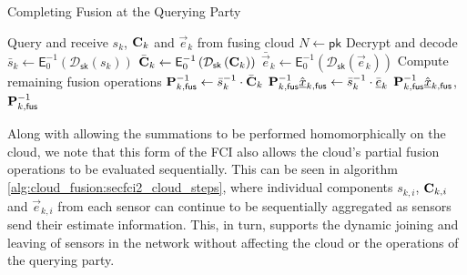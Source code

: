 \begin{algorithm}[htbp]
\caption{Completing Fusion at the Querying Party}\label{alg:cloud_fusion:secfci2_query_steps}
\begin{algorithmic}[1]
    \State Query and receive $s_k$, ${{\mathbf{C}}}_k$ and $\vec{e}_k$ from fusing cloud
    \State $N \gets \mathsf{pk}$
    \LineComment Decrypt and decode
    \State $\bar{s}_k \gets \mathsf{E}^{-1}_{0}\left(\mathcal{D}_{\mathsf{sk}}\left(s_k\right)\right)$
    \State $\bar{{{\mathbf{C}}}}_k \gets \mathsf{E}^{-1}_{0}\left(\mathcal{D}_{\mathsf{sk}}\left({{\mathbf{C}}}_k\right)\right)$
    \State $\bar{\vec{e}}_k \gets \mathsf{E}^{-1}_{0}\left(\mathcal{D}_{\mathsf{sk}}\left(\vec{e}_k\right)\right)$
    \LineComment Compute remaining fusion operations
    \State ${{\mathbf{P}}}_{k,\mathsf{fus}}^{-1} \gets \bar{s}_k^{-1} \cdot \bar{{{\mathbf{C}}}}_k$
    \State ${{\mathbf{P}}}_{k,\mathsf{fus}}^{-1}\hat{{\underline{x}}}_{k,\mathsf{fus}} \gets \bar{s}_k^{-1} \cdot \bar{{\underline{e}}}_k$
    \State \Return ${{\mathbf{P}}}_{k,\mathsf{fus}}^{-1}\hat{{\underline{x}}}_{k,\mathsf{fus}}$, ${{\mathbf{P}}}_{k,\mathsf{fus}}^{-1}$
    \EndProcedure
\end{algorithmic}
\end{algorithm}

Along with allowing the summations to be performed homomorphically on the cloud, we note that this form of the FCI also allows the cloud's partial fusion operations to be evaluated sequentially. This can be seen in algorithm \ref{alg:cloud_fusion:secfci2_cloud_steps}, where individual components $s_{k, i}$, ${{\mathbf{C}}}_{k, i}$ and $\vec{e}_{k, i}$ from each sensor can continue to be sequentially aggregated as sensors send their estimate information. This, in turn, supports the dynamic joining and leaving of sensors in the network without affecting the cloud or the operations of the querying party.

% 
% 

